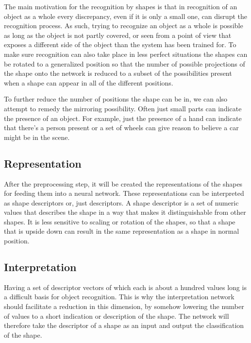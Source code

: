 \documentclass[9pt,shortpaper,twoside,web]{ieeecolor}
\begin{document}
The main motivation for the recognition by shapes is that in recognition of an object as a whole every discrepancy, even if it is only a small one, can disrupt the recognition process. As such, trying to recognize an object as a whole is possible as long as the object is not partly covered, or seen from a point of view that exposes a different side of the object than the system has been trained for. To make sure recognition can also take place in less perfect situations  the shapes can be rotated to a generalized position so that the number of possible projections of the shape onto the network is reduced to a subset of the possibilities present when a shape can appear in all of the different positions. 

To further reduce the number of positions the shape can be in, we can also attempt to remedy the mirroring possibility.
Often just small parts can indicate the presence of an object. For example, just the presence of a hand can indicate that there’s a person present or a set of wheels can give reason to believe a car might be in the scene. 
\\

\subsection{Representation}
After the preprocessing step, it will be created the representations of the shapes  for feeding them into a neural network. These representations can be  interpreted as shape descriptors or, just descriptors. A shape descriptor is a set of numeric values that describes the shape in a way that makes it distinguishable from other shapes. It is less sensitive to scaling or rotation of the shapes, so that a shape that is upside down can result in the same representation as a shape in normal position.
\\

\subsection{Interpretation}
Having a set of descriptor vectors of which each is about a hundred values long is a difficult basis for object recognition. This is why  the interpretation network should facilitate a reduction in this dimension, by somehow lowering the number of values to a short indication or description of the shape. The network will therefore take the descriptor of a shape as an input and output the classification of the shape. 
\\
\end{document}
